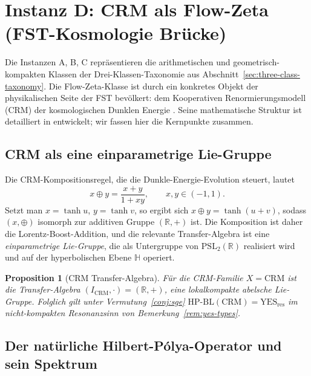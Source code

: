 \documentclass[11pt]{article}
\newtheorem{proposition}[theorem]{Proposition}
\theoremstyle{definition}
\theoremstyle{remark}
\newcommand{\HBL}{\mathrm{HP\text{-}BL}}
\newcommand{\PSL}{\mathrm{PSL}}
\begin{document}
\section{Instanz D: CRM als Flow-Zeta (FST-Kosmologie Brücke)}
\label{sec:crm-flow}

Die Instanzen A, B, C repräsentieren die arithmetischen und geometrisch-kompakten
Klassen der Drei-Klassen-Taxonomie aus Abschnitt~\ref{sec:three-class-taxonomy}.
Die Flow-Zeta-Klasse ist durch ein konkretes Objekt der
physikalischen Seite der FST bevölkert: dem Kooperativen Renormierungsmodell (CRM)
der kosmologischen Dunklen Energie \cite{RFEPFramework}. Seine mathematische
Struktur ist detailliert in \cite{CRMFlowZetaNote} entwickelt; wir
fassen hier die Kernpunkte zusammen.

\subsection{CRM als eine einparametrige Lie-Gruppe}

Die CRM-Kompositionsregel, die die Dunkle-Energie-Evolution steuert, lautet
\begin{equation}
\label{eq:crm-composition}
  x \oplus y = \frac{x+y}{1+xy}, \qquad x, y \in (-1, 1).
\end{equation}
Setzt man $x = \tanh u$, $y = \tanh v$, so ergibt sich $x \oplus y = \tanh(u+v)$,
sodass $(x, \oplus)$ isomorph zur additiven Gruppe $(\mathbb{R},
+)$ ist. Die Komposition ist daher die Lorentz-Boost-Addition, und
die relevante Transfer-Algebra ist eine \emph{einparametrige Lie-Gruppe},
die als Untergruppe von $\PSL_2(\mathbb{R})$ realisiert wird und auf der
hyperbolischen Ebene $\mathbb{H}$ operiert.

\begin{proposition}[CRM Transfer-Algebra]\label{prop:crm-transfer}
Für die CRM-Familie $X = \mathrm{CRM}$ ist die Transfer-Algebra
$(I_{\mathrm{CRM}}, \cdot) = (\mathbb{R}, +)$, eine lokalkompakte
abelsche Lie-Gruppe. Folglich gilt unter Vermutung~\ref{conj:sge}
$\HBL(\mathrm{CRM}) = \mathrm{YES}_{\mathrm{res}}$ im
nicht-kompakten Resonanzsinn von Bemerkung~\ref{rem:yes-types}.
\end{proposition}

\subsection{Der natürliche Hilbert-P\'olya-Operator und sein Spektrum}
\end{document}
